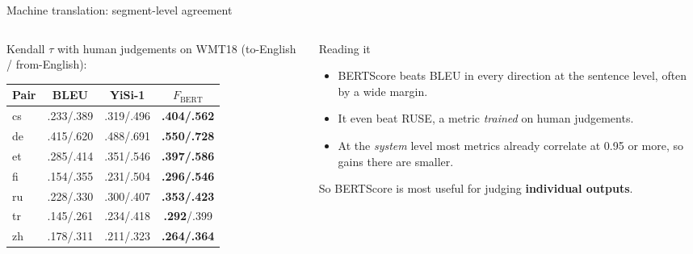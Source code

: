 \documentclass[aspectratio=169,11pt]{beamer}
\begin{document}
\begin{frame}{Machine translation: segment-level agreement}
  \begin{columns}[T]
    \begin{column}{0.56\textwidth}
      \footnotesize
      Kendall $\tau$ with human judgements on WMT18 (to-English / from-English):
      \vspace{1mm}

      \begin{tabular}{@{}lccc@{}}
        \toprule
        Pair & BLEU & YiSi-1 & $F_{\text{BERT}}$\\
        \midrule
        cs & .233/.389 & .319/.496 & \textbf{.404/.562}\\
        de & .415/.620 & .488/.691 & \textbf{.550/.728}\\
        et & .285/.414 & .351/.546 & \textbf{.397/.586}\\
        fi & .154/.355 & .231/.504 & \textbf{.296/.546}\\
        ru & .228/.330 & .300/.407 & \textbf{.353/.423}\\
        tr & .145/.261 & .234/.418 & \textbf{.292}/.399\\
        zh & .178/.311 & .211/.323 & \textbf{.264/.364}\\
        \bottomrule
      \end{tabular}
    \end{column}
    \begin{column}{0.4\textwidth}
      \begin{exampleblock}{Reading it}
        \small
        \begin{itemize}
          \item BERTScore beats BLEU in every direction at the sentence level, often by a wide margin.
          \item It even beat RUSE, a metric \emph{trained} on human judgements.
          \item At the \emph{system} level most metrics already correlate at 0.95 or more, so gains there are smaller.
        \end{itemize}
        So BERTScore is most useful for judging \textbf{individual outputs}.
      \end{exampleblock}
    \end{column}
  \end{columns}
\end{frame}
\end{document}
